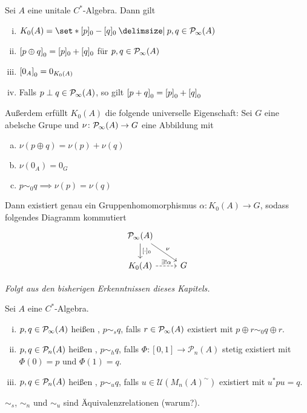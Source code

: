 \begin{proposition}[label=prop:66]
	Sei $A$ eine unitale $C^*$-Algebra.
	Dann gilt
	\begin{enumerate}[(i)]
		\item $K_0(A) = \set*{[p]_0 - [q]_0 \given p,q \in \Pinfty(A)}$
		\item $\benbrace*{p \oplus q}_0 = [p]_0 + [q]_0$ für $p,q \in \Pinfty(A)$
		\item $\benbrace*{0_A}_0 = 0_{K_0(A)}$
		\item Falls $p \perp q \in \Pinfty(A)$, so gilt $\benbrace*{p + q}_0 = \benbrace*{p}_0 + \benbrace*{q}_0$
	\end{enumerate}
	Außerdem erfüllt $K_0(A)$ die folgende universelle Eigenschaft: Sei $G$ eine abelsche Grupe und $\nu \colon \Pinfty(A) \to G$ eine Abbildung mit
	\begin{enumerate}[a)]
		\item $\nu(p \oplus q) = \nu(p) + \nu(q)$
		\item $\nu(0_A) = 0_G$
		\item $p \sim_0 q \implies \nu(p)=\nu(q)$
	\end{enumerate}
	Dann existiert genau ein Gruppenhomomorphismus $\alpha \colon K_0(A) \to G$, sodass folgendes Diagramm kommutiert
	\[
		\begin{tikzcd}
			\Pinfty(A) \dar["{[\cdot]_0}"] \drar["\nu"] &\\
			K_0(A) \rar[dashed,"\exists! \alpha"] & G
		\end{tikzcd}
	\]
\end{proposition}
\begin{beweis}
	\emph{Folgt aus den bisherigen Erkenntnissen dieses Kapitels.}
\end{beweis}

\begin{definition}[label=def67,{name=[{stabil äquivalent, homotop, unitär äquivalent}]}]
	Sei $A$ eine $C^*$-Algebra.
	\begin{enumerate}[(i)]
		\item $p,q \in \Pinfty(A)$ heißen , $p \sim_s q$, falls $r \in \Pinfty(A)$ existiert mit $p \oplus r \sim_0 q \oplus r$.
		\item $p,q \in \kernedP_n(A)$ heißen , $p \sim_h q$, falls $\Phi \colon [0,1] \to \mathcal{P}_n(A)$ stetig existiert mit $\Phi(0)=p$ und $\Phi(1)=q$. 
		\item $p,q \in \kernedP_n(A)$ heißen , $p \sim_u q$, falls $u \in \mathcal{U}(M_n(A)^\sim)$ existiert mit $u^* p u = q$.
	\end{enumerate}
	$\sim_s$, $\sim_n$ und $\sim_u$ sind Äquivalenzrelationen (warum?).
\end{definition}

